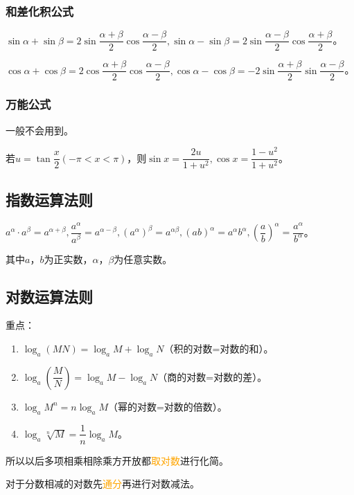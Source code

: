 \documentclass[UTF8, 12pt]{ctexart}
\begin{document}
\subsubsection{和差化积公式}

$\sin\alpha+\sin\beta=2\sin\dfrac{\alpha+\beta}{2}\cos\dfrac{\alpha-\beta}{2},\sin\alpha-\sin\beta=2\sin\dfrac{\alpha-\beta}{2}\cos\dfrac{\alpha+\beta}{2}$。

$\cos\alpha+\cos\beta=2\cos\dfrac{\alpha+\beta}{2}\cos\dfrac{\alpha-\beta}{2},\cos\alpha-\cos\beta=-2\sin\dfrac{\alpha+\beta}{2}\sin\dfrac{\alpha-\beta}{2}$。

\subsubsection{万能公式}

一般不会用到。

若$u=\tan\dfrac{x}{2}(-\pi<x<\pi)$，则$\sin x=\dfrac{2u}{1+u^2},\cos x=\dfrac{1-u^2}{1+u^2}$。

\subsection{指数运算法则}

$a^\alpha\cdot a^\beta=a^{\alpha+\beta},\dfrac{a^\alpha}{a^\beta}=a^{\alpha-\beta},(a^\alpha)^\beta=a^{\alpha\beta},(ab)^\alpha=a^\alpha b^\alpha,(\dfrac{a}{b})^\alpha=\dfrac{a^\alpha}{b^\alpha}$。

其中$a$，$b$为正实数，$\alpha$，$\beta$为任意实数。

\subsection{对数运算法则}

重点：

\begin{enumerate}
    \item $\log_a(MN)=\log_aM+\log_aN$（积的对数=对数的和）。
    \item $\log_a(\dfrac{M}{N})=\log_aM-\log_aN$（商的对数=对数的差）。
    \item $\log_aM^n=n\log_aM$（幂的对数=对数的倍数）。
    \item $\log_a\sqrt[n]{M}=\dfrac{1}{n}\log_aM$。
\end{enumerate}

所以以后多项相乘相除乘方开放都\textcolor{orange}{取对数}进行化简。

对于分数相减的对数先\textcolor{orange}{通分}再进行对数减法。
\end{document}
